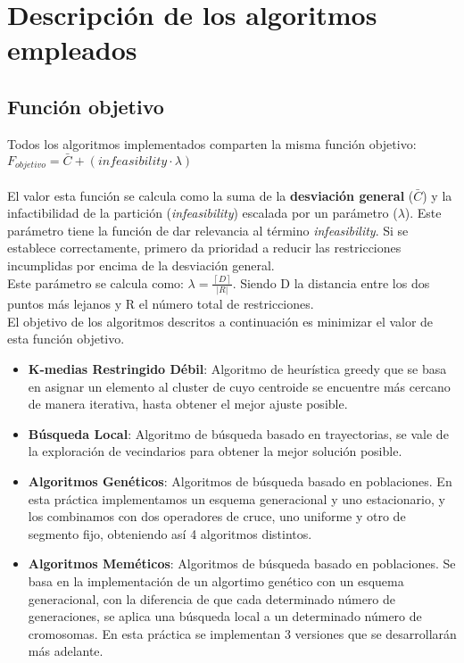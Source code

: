 \chapter{Descripción de los algoritmos empleados}
\section{Función objetivo}

Todos los algoritmos implementados comparten la misma función objetivo: $ F_{objetivo} = \bar{C} + (infeasibility \cdot \lambda) $\\
\\
El valor esta función se calcula como la suma de la \textbf{desviación general} ($ \bar{C} $) y la infactibilidad de la partición (\emph{infeasibility}) escalada por un parámetro ($ \lambda $). Este parámetro tiene la función de dar relevancia al término \emph{infeasibility}. Si se establece correctamente, primero da prioridad a reducir las restricciones incumplidas por encima de la desviación general.\\ Este parámetro se calcula como: $ \lambda = \frac{\left \lceil D \right \rceil}{\left | R \right |}$. Siendo D la distancia entre los dos puntos más lejanos y R el número total de restricciones. \\
El objetivo de los algoritmos descritos a continuación es minimizar el valor de esta función objetivo.

\begin{itemize}
   \item \textbf{K-medias Restringido Débil}: Algoritmo de heurística greedy que se basa en asignar un elemento al cluster de cuyo centroide se encuentre más cercano de manera iterativa, hasta obtener el mejor ajuste posible.
   \item \textbf{Búsqueda Local}: Algoritmo de búsqueda basado en trayectorias, se vale de la exploración de vecindarios para obtener la mejor solución posible.
   \item \textbf{Algoritmos Genéticos}: Algoritmos de búsqueda basado en poblaciones. En esta práctica implementamos un esquema generacional y uno estacionario, y los combinamos con dos operadores de cruce, uno uniforme y otro de segmento fijo, obteniendo así 4 algoritmos distintos.
   \item \textbf{Algoritmos Meméticos}: Algoritmos de búsqueda basado en poblaciones. Se basa en la implementación de un algortimo genético con un esquema generacional, con la diferencia de que cada determinado número de generaciones, se aplica una búsqueda local a un determinado número de cromosomas. En esta práctica se implementan 3 versiones que se desarrollarán más adelante.

\end{itemize}

